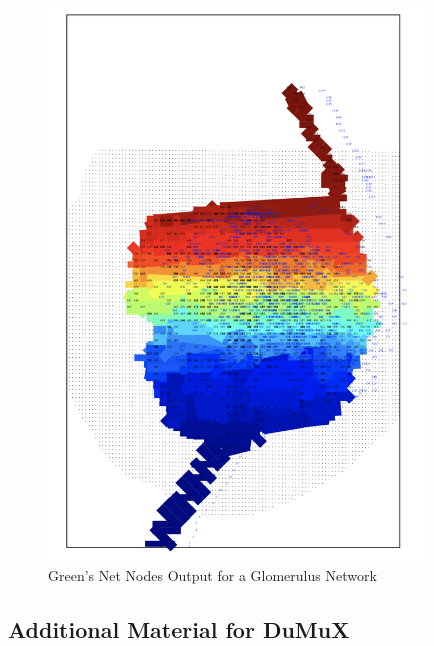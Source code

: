 \begin{figure}[h]
\centering
\includegraphics[width=100mm]{NetNodesSegs_Glom}
\caption{\footnotesize Green's Net Nodes Output for a Glomerulus Network}
\label{fig:NetNodesSegs_Glom}
\end{figure}

\subsection{Additional Material for DuMuX}



